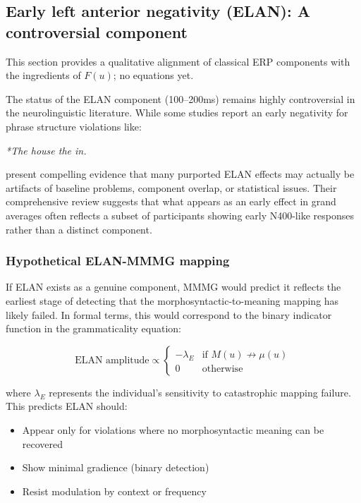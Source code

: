 \documentclass[12pt,letterpaper]{article}
\begin{document}
\subsection{Early left anterior negativity (ELAN): A controversial component}

This section provides a qualitative alignment of classical ERP components
with the ingredients of $F(u)$; no equations yet.

The status of the ELAN component (100--200ms) remains highly controversial in the neurolinguistic literature. While some studies report an early negativity for phrase structure violations like:

\ea \label{ex:ELAN}
\textit{*The house the in.}
\z

\textcite{Steinhauer2012} present compelling evidence that many purported ELAN effects may actually be artifacts of baseline problems, component overlap, or statistical issues. Their comprehensive review suggests that what appears as an early effect in grand averages often reflects a subset of participants showing early N400-like responses rather than a distinct component.

\subsubsection{Hypothetical ELAN-MMMG mapping}

If ELAN exists as a genuine component, MMMG would predict it reflects the earliest stage of detecting that the morphosyntactic-to-meaning mapping has likely failed. In formal terms, this would correspond to the binary indicator function in the grammaticality equation:

\[
\text{ELAN amplitude} \propto \begin{cases}
-\lambda_E & \text{if } M(u) \not\to \mu(u) \\
0 & \text{otherwise}
\end{cases}
\]

where $\lambda_E$ represents the individual's sensitivity to catastrophic mapping failure. This predicts ELAN should:
\begin{itemize}
    \item Appear only for violations where no morphosyntactic meaning can be recovered
    \item Show minimal gradience (binary detection)
    \item Resist modulation by context or frequency
\end{itemize}
\end{document}
